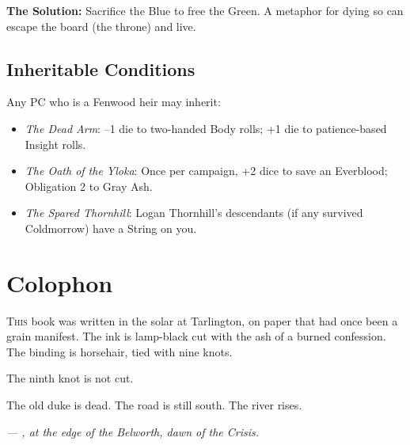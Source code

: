 \documentclass[11pt,a5paper]{book}
\newcommand{\condition}[1]{\textit{#1}}
\begin{document}
\textbf{The Solution:} Sacrifice the Blue to free the Green. A metaphor for \braedon{} dying so \veralyn{} can escape the board (the throne) and live.

\section*{Inheritable Conditions}

Any PC who is a Fenwood heir may inherit:

\begin{itemize}[leftmargin=*]
\item \condition{The Dead Arm}: --1 die to two-handed Body rolls; +1 die to patience-based Insight rolls.
\item \condition{The Oath of the Yloka}: Once per campaign, +2 dice to save an Everblood; Obligation 2 to Gray Ash.
\item \condition{The Spared Thornhill}: Logan Thornhill's descendants (if any survived Coldmorrow) have a String on you.
\end{itemize}

\clearpage

\chapter*{Colophon}

\lettrine{T}{his} book was written in the solar at Tarlington, on paper that had once been a grain manifest. The ink is lamp-black cut with the ash of a burned confession. The binding is horsehair, tied with nine knots.

The ninth knot is not cut.

The old duke is dead. The road is still south. The river rises.

\vspace{1em}
\noindent\textit{--- \gray, at the edge of the Belworth, dawn of the Crisis.}
\end{document}
